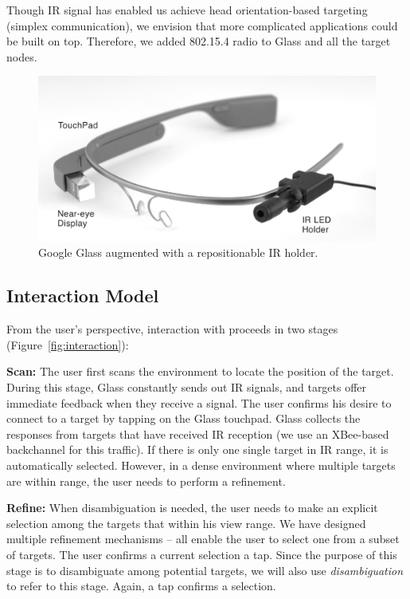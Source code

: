 Though IR signal has enabled us achieve head orientation-based targeting (simplex communication), we envision that more complicated applications could be built on top. Therefore, we added 802.15.4 radio to Glass and all the target nodes.

\begin{figure}[t]
\centering
\includegraphics[width=0.9\columnwidth]{figures/GlassWithHolder.jpg}
\caption{Google Glass augmented with a repositionable IR holder.}
\label{fig:glass}
\end{figure}

\subsection{Interaction Model}
From the user's perspective, interaction with \systemname proceeds in two stages (Figure~\ref{fig:interaction}): 

{\bf Scan:} The user first scans the environment to locate the position of the target. During this stage, Glass constantly sends out IR signals, and  targets offer immediate feedback when they receive a signal. The user confirms his desire to connect to a target by tapping on the Glass touchpad. Glass collects the responses from targets that have received IR reception (we use an XBee-based backchannel for this traffic). If there is only one single target in IR range, it is automatically selected. However, in a dense environment where multiple targets are within range, the user needs to perform a refinement.

{\bf Refine:} When disambiguation is needed, the user needs to make an explicit selection among the targets that within his view range. We have designed multiple refinement mechanisms -- all enable the user to select one from a subset of targets. The user confirms a current selection a tap. Since the purpose of this stage is to disambiguate among potential targets, we will also use {\em disambiguation} to refer to this stage. Again, a tap confirms a selection.

